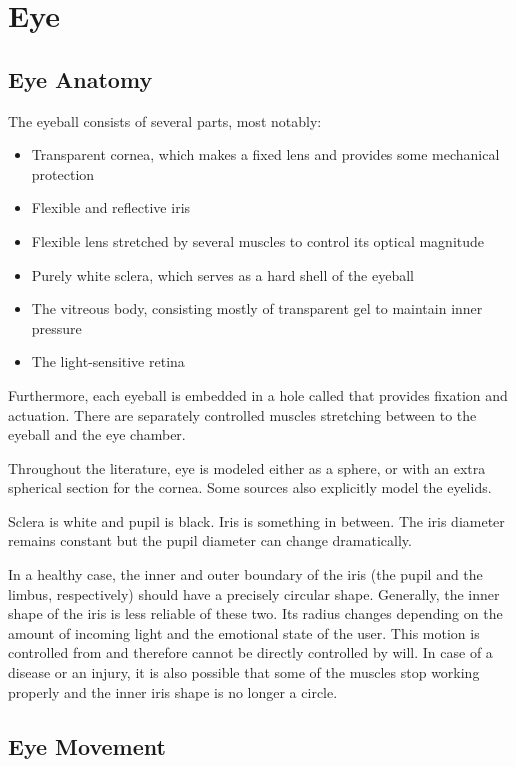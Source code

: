 \section{Eye}
\subsection{Eye Anatomy}

The eyeball consists of several parts, most notably:
\begin{itemize}
\item Transparent cornea, which makes a fixed lens and provides some mechanical protection
\item Flexible and reflective iris
\item Flexible lens stretched by several muscles to control its optical magnitude
\item Purely white sclera, which serves as a hard shell of the eyeball
\item The vitreous body, consisting mostly of transparent gel to maintain inner pressure
\item The light-sensitive retina
\end{itemize}

Furthermore, each eyeball is embedded in a hole called  that provides fixation and actuation.
There are  separately controlled muscles stretching between to the eyeball and the eye chamber.

Throughout the literature, eye is modeled either as a sphere, or with an extra spherical section for the cornea.
Some sources also explicitly model the eyelids.

Sclera is white and pupil is black.
Iris is something in between.
The iris diameter remains constant but the pupil diameter can change dramatically.

In a healthy case, the inner and outer boundary of the iris (the pupil and the limbus, respectively) should have a precisely circular shape.
Generally, the inner shape of the iris is less reliable of these two.
Its radius changes depending on the amount of incoming light and the emotional state of the user.
This motion is controlled from  and therefore cannot be directly controlled by will.
In case of a disease or an injury, it is also possible that some of the muscles stop working properly and the inner iris shape is no longer a circle.

\subsection{Eye Movement}

